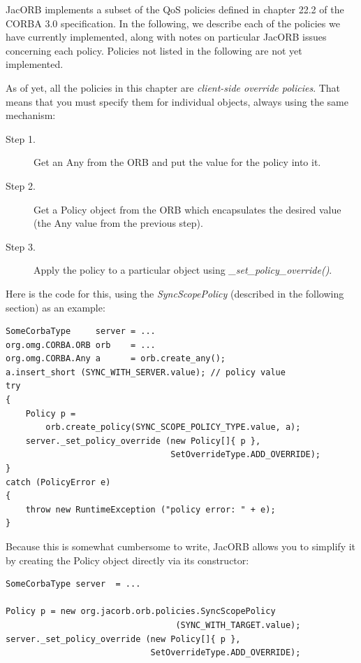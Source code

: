 
JacORB implements a subset of the QoS policies defined in chapter
22.2 of the CORBA 3.0 specification.  In the following, we describe
each of the policies we have currently implemented, along with notes
on particular JacORB issues concerning each policy.  Policies not
listed in the following are not yet implemented.

As of yet, all the policies in this chapter are \emph{client-side
override policies}.  That means that you must specify them for
individual objects, always using the same mechanism:

\begin{description}
\item[Step 1.] Get an Any from the ORB and put the value for the
           policy into it.
\item[Step 2.] Get a Policy object from the ORB which encapsulates the
           desired value (the Any value from the previous step).
\item[Step 3.] Apply the policy to a particular object using
           \emph{\_set\_policy\_override()}.
\end{description}

Here is the code for this, using the \emph{SyncScopePolicy}
(described in the following section) as an example:

\begin{verbatim}
SomeCorbaType     server = ...
org.omg.CORBA.ORB orb    = ...
org.omg.CORBA.Any a      = orb.create_any();
a.insert_short (SYNC_WITH_SERVER.value); // policy value
try
{
    Policy p =
        orb.create_policy(SYNC_SCOPE_POLICY_TYPE.value, a);
    server._set_policy_override (new Policy[]{ p },
                                 SetOverrideType.ADD_OVERRIDE);
}
catch (PolicyError e)
{
    throw new RuntimeException ("policy error: " + e);
}
\end{verbatim}

Because this is somewhat cumbersome to write, JacORB allows you to
simplify it by creating the Policy object directly via its
constructor:

\newpage

\begin{verbatim}
SomeCorbaType server  = ...

Policy p = new org.jacorb.orb.policies.SyncScopePolicy
                                  (SYNC_WITH_TARGET.value);
server._set_policy_override (new Policy[]{ p },
                             SetOverrideType.ADD_OVERRIDE);
\end{verbatim}

